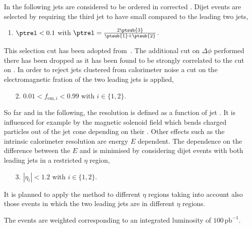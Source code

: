 \documentclass[a4paper]{cmspaper} %
\begin{document}
In the following jets are considered to be ordered in corrected \ptreco.
Dijet events are selected by requiring the third jet to have small \pt compared to the leading two jets,
\begin{enumerate}
\item $\ptrel < 0.1$ with $\ptrel = \frac{2\ptsub{3}}{\ptsub{1} + \ptsub{2}}$.
\end{enumerate}
This selection cut has been adopted from~\cite{CMSAN-2008/031}.
The additional cut on $\Delta\phi$ performed there has been dropped as it has been found to be strongly correlated to the cut on \ptrel.
In order to reject jets clustered from calorimeter noise a cut on the electromagnetic fration of the two leading jets is applied,
\begin{enumerate}
\item[2.] $0.01 < f_{\text{em},i} < 0.99$ with $i\in\{1,2\}$.
\end{enumerate}

So far and in the following, the resolution is defined as a function of jet \pt.
It is influenced for example by the magnetic solenoid field which bends charged particles out of the jet cone depending on their \pt.
Other effects such as the intrinsic calorimeter resolution are energy $E$ dependent.
The dependence on the difference between the $E$ and \pt is minimised by considering dijet events with both leading jets in a restricted $\eta$ region,
\begin{enumerate}
\item[3.] $|\eta_{i}| < 1.2$ with $i\in\{1,2\}$.
\end{enumerate}
It is planned to apply the method to different $\eta$ regions taking into account also those events in which the two leading jets are in different $\eta$ regions.

The events are weighted corresponding to an integrated luminosity of $100\,\text{pb}^{-1}$.
\end{document}
